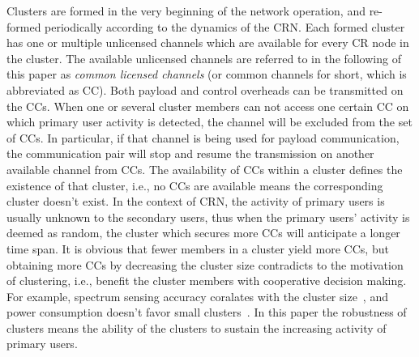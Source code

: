 \documentclass[10pt,journal,compsoc]{IEEEtran}
\theoremstyle{mytheoremstyle}
\theoremstyle{mytheoremstyle}
\theoremstyle{mytheoremstyle}
\newcommand{\ie}{i.e., }
\begin{document}

Clusters are formed in the very beginning of the network operation, and re-formed periodically according to the dynamics of the CRN.
Each formed cluster has one or multiple unlicensed channels which are available for every CR node in the cluster.
The available unlicensed channels are referred to in the following of this paper as \textit{common licensed channels} (or common channels for short, which is abbreviated as CC).
Both payload and control overheads can be transmitted on the CCs.
When one or several cluster members can not access one certain CC on which primary user activity is detected, the channel will be excluded from the set of CCs.
In particular, if that channel is being used for payload communication, the communication pair will stop and resume the transmission on another available channel from CCs.
The availability of CCs within a cluster defines the existence of that cluster, \ie no CCs are available means the corresponding cluster doesn't exist.
In the context of CRN, the activity of primary users is usually unknown to the secondary users, thus when the primary users' activity is deemed as random, the cluster which secures more CCs will anticipate a longer time span.
It is obvious that fewer members in a cluster yield more CCs, but obtaining more CCs by decreasing the cluster size contradicts to the motivation of clustering, \ie benefit the cluster members with cooperative decision making.
For example, spectrum sensing accuracy coralates with the cluster size~\cite{Consensus_based_clustering12}, and power consumption doesn't favor small clusters~\cite{clustering_globecom11, EnergyEfficientClusteringRouting_2015}.
In this paper the robustness of clusters means the ability of the clusters to sustain the increasing activity of primary users.
\end{document}
